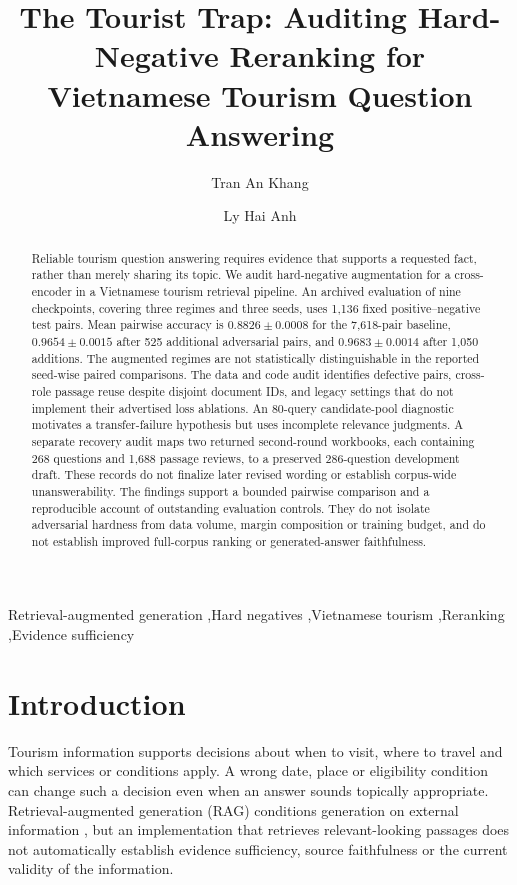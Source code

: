 \documentclass[preprint,12pt,numbers,sort&compress]{elsarticle}
\begin{document}
\begin{frontmatter}
\title{The Tourist Trap: Auditing Hard-Negative Reranking for Vietnamese Tourism Question Answering}
\author[aff1]{Tran An Khang}
\author[aff1]{Ly Hai Anh}

\begin{abstract}
Reliable tourism question answering requires evidence that supports a requested
fact, rather than merely sharing its topic. We audit hard-negative augmentation
for a cross-encoder in a Vietnamese tourism retrieval pipeline. An archived
evaluation of nine checkpoints, covering three regimes and three seeds, uses
1,136 fixed positive--negative test pairs. Mean pairwise accuracy is
$0.8826\pm0.0008$ for the 7,618-pair baseline, $0.9654\pm0.0015$ after 525
additional adversarial pairs, and $0.9683\pm0.0014$ after 1,050 additions.
The augmented regimes are not statistically distinguishable in the reported
seed-wise paired comparisons. The data and code audit identifies defective
pairs, cross-role passage reuse despite disjoint document IDs, and legacy
settings that do not implement their advertised loss ablations. An 80-query
candidate-pool diagnostic motivates a transfer-failure hypothesis but uses
incomplete relevance judgments. A separate recovery audit maps two returned
second-round workbooks, each containing 268 questions and 1,688 passage reviews,
to a preserved 286-question development draft. These records do not finalize
later revised wording or establish corpus-wide unanswerability. The findings
support a bounded pairwise comparison and a reproducible account of outstanding
evaluation controls. They do not isolate adversarial hardness from data volume,
margin composition or training budget, and do not establish improved full-corpus
ranking or generated-answer faithfulness.
\end{abstract}
\begin{keyword}
Retrieval-augmented generation \sep Hard negatives \sep Vietnamese tourism \sep Reranking \sep Evidence sufficiency
\end{keyword}
\end{frontmatter}

\section{Introduction}
Tourism information supports decisions about when to visit, where to travel and
which services or conditions apply. A wrong date, place or eligibility condition
can change such a decision even when an answer sounds topically appropriate.
Retrieval-augmented generation (RAG) conditions generation on external
information \citep{lewis2020retrieval}, but an implementation that retrieves
relevant-looking passages does not automatically establish evidence sufficiency,
source faithfulness or the current validity of the information.
\end{document}
